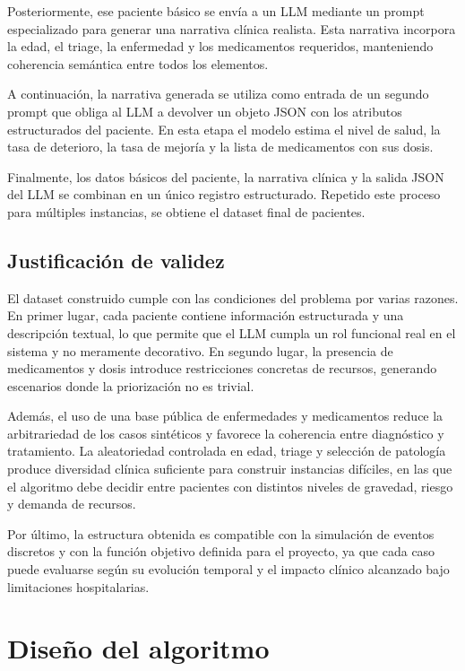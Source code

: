 \documentclass[12pt,a4paper]{article}
\begin{document}
Posteriormente, ese paciente básico se envía a un LLM mediante un prompt especializado para 
generar una narrativa clínica realista. 
Esta narrativa incorpora la edad, el triage, la enfermedad y los medicamentos requeridos, 
manteniendo coherencia semántica entre todos los elementos.

A continuación, la narrativa generada se utiliza como entrada de un segundo prompt 
que obliga al LLM a devolver un objeto JSON con los atributos estructurados del paciente. 
En esta etapa el modelo estima el nivel de salud, la tasa de deterioro, la tasa de mejoría y 
la lista de medicamentos con sus dosis.

Finalmente, los datos básicos del paciente, la narrativa clínica y la salida JSON del LLM 
se combinan en un único registro estructurado. Repetido este proceso para múltiples instancias, 
se obtiene el dataset final de pacientes.

\subsection{Justificación de validez}

El dataset construido cumple con las condiciones del problema por varias razones. 
En primer lugar, cada paciente contiene información estructurada y una descripción textual, 
lo que permite que el LLM cumpla un rol funcional real en el sistema y no meramente decorativo. 
En segundo lugar, la presencia de medicamentos y dosis introduce restricciones concretas de recursos, 
generando escenarios donde la priorización no es trivial.

Además, el uso de una base pública de enfermedades y medicamentos reduce la arbitrariedad de los casos sintéticos 
y favorece la coherencia entre diagnóstico y tratamiento. La aleatoriedad controlada en edad, triage y selección 
de patología produce diversidad clínica suficiente para construir instancias difíciles, en las que el algoritmo debe 
decidir entre pacientes con distintos niveles de gravedad, riesgo y demanda de recursos.

Por último, la estructura obtenida es compatible con la simulación de eventos discretos 
y con la función objetivo definida para el proyecto, ya que cada caso puede evaluarse según su evolución temporal 
y el impacto clínico alcanzado bajo limitaciones hospitalarias.

\section{Diseño del algoritmo}
\end{document}
